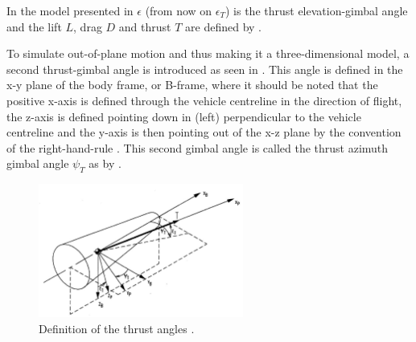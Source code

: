 

In the model presented in  $\epsilon$ (from now on $\epsilon_{T}$) is the thrust elevation-gimbal angle and the lift $L$, drag $D$ and thrust $T$ are defined by  \cite{wittenberg2014rocket}. 

To simulate out-of-plane motion and thus making it a three-dimensional model, a second thrust-gimbal angle is introduced as seen in . This angle is defined in the x-y plane of the body frame, or B-frame, where it should be noted that the positive x-axis is defined through the vehicle centreline in the direction of flight, the z-axis is defined pointing down in  (left) perpendicular to the vehicle centreline and the y-axis is then pointing out of the x-z plane by the convention of the right-hand-rule . This second gimbal angle is called the thrust azimuth gimbal angle $\psi_{T}$ as by \cite{mooij1994motion}.

\begin{figure}[!ht]
\centering
\includegraphics[width=0.6\textwidth]{figures/reference_frames/propframe_mooij1994motion.jpg}
\caption{Definition of the thrust angles \cite{mooij1994motion}.}
\label{fig:propframe2_mooij1994motion}
\end{figure}


